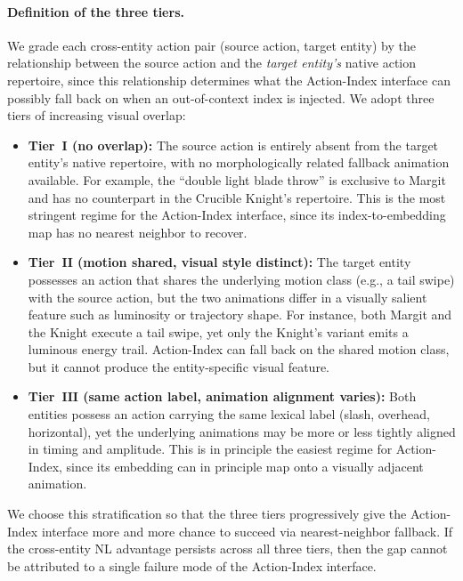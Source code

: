 \paragraph{Definition of the three tiers.}
We grade each cross-entity action pair (source action, target entity) by the relationship between the source action and the \emph{target entity's} native action repertoire, since this relationship determines what the Action-Index interface can possibly fall back on when an out-of-context index is injected. We adopt three tiers of increasing visual overlap:
\begin{itemize}[leftmargin=*,topsep=2pt,itemsep=2pt]
  \item \textbf{Tier~$\mathbf{I}$ (no overlap):} The source action is entirely absent from the target entity's native repertoire, with no morphologically related fallback animation available. For example, the ``double light blade throw'' is exclusive to Margit and has no counterpart in the Crucible Knight's repertoire. This is the most stringent regime for the Action-Index interface, since its index-to-embedding map has no nearest neighbor to recover.
  \item \textbf{Tier~$\mathbf{II}$ (motion shared, visual style distinct):} The target entity possesses an action that shares the underlying motion class (e.g., a tail swipe) with the source action, but the two animations differ in a visually salient feature such as luminosity or trajectory shape. For instance, both Margit and the Knight execute a tail swipe, yet only the Knight's variant emits a luminous energy trail. Action-Index can fall back on the shared motion class, but it cannot produce the entity-specific visual feature.
  \item \textbf{Tier~$\mathbf{III}$ (same action label, animation alignment varies):} Both entities possess an action carrying the same lexical label (slash, overhead, horizontal), yet the underlying animations may be more or less tightly aligned in timing and amplitude. This is in principle the easiest regime for Action-Index, since its embedding can in principle map onto a visually adjacent animation.
\end{itemize}
We choose this stratification so that the three tiers progressively give the Action-Index interface more and more chance to succeed via nearest-neighbor fallback. If the cross-entity NL advantage persists across all three tiers, then the gap cannot be attributed to a single failure mode of the Action-Index interface.

